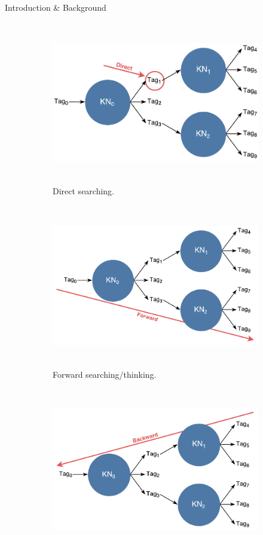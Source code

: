 \documentclass[final]{beamer} %
\begin{document}
\begin{frame}
\begin{columns}
\begin{column}{.33\textwidth}
{\begin{block}{Introduction \& Background}
					\begin{figure}[!htb]
						\centering
						\begin{subfigure}[!htb]{0.49\columnwidth}
							\centering
							\includegraphics[height=2.8in]{figures/direct_search.pdf}
							\caption{Direct searching.}
						\end{subfigure}
						\begin{subfigure}[!htb]{0.49\columnwidth}
							\centering
							\includegraphics[height=2.8in]{figures/forward_search.pdf}
							\caption{Forward searching/thinking.}
							\label{think_forwards}
						\end{subfigure}
						\bigskip
						\begin{subfigure}[!htb]{0.49\columnwidth}
							\centering
							\includegraphics[height=2.8in]{figures/backward_search.pdf}

\end{subfigure}
\end{figure}
\end{block}}
\end{column}
\end{columns}
\end{frame}
\end{document}
